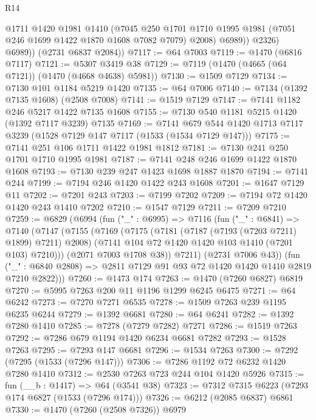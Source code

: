 \begin{lexlean}{R14}
\begin{coremodule}
                @1711
                @1420
                @1981
                @1410
                (@7045
                  @250
                  @1701
                  @1710
                  @1995
                  @1981
                  (@7051 @246 @1699 @1422 @1870 @1608 @7082 @7079)
                  @2008)
                @6989))
            @2326)
          @6989))
      (@2731 @6837 @2084))
@7117 := @64 @7003
@7119 := @1470 (@6816 @7117)
@7121 := @5307 @3419 @38
@7129 := @7119 (@1470 (@4665 (@64 @7121)) (@1470 (@4668 @4638) @5981))
@7130 := @1509 @7129
@7134 := @7130 @101 @1184 @5219 @1420
@7135 := @64 @7006
@7140 := @7134 (@1392 @7135 @1608) (@2508 @7008)
@7141 := @1519 @7129
@7147 := @7141 @1182 @246 @5217 @1422 @7135 @1608
@7155 := @7130 @540 @1181 @5215 @1420 (@1392 @7117 @3239) @7135
@7169 := @7141 @679 @544 @1420 @1713 @7117 @3239 (@1528 @7129 @147 @7117 (@1533 (@1534 @7129 @147)))
@7175 := @7141 @251 @106 @1711 @1422 @1981 @1812
@7181 := @7130 @241 @250 @1701 @1710 @1995 @1981
@7187 := @7141 @248 @246 @1699 @1422 @1870 @1608
@7193 := @7130 @239 @247 @1423 @1698 @1887 @1870
@7194 := @7141 @244
@7199 := @7194 @246 @1420 @1422 @243 @1608
@7201 := @1647 @7129 @11
@7202 := @7201 @243
@7203 := @7199 @7202
@7209 := @7194 @72 @1420 @1420 @243 @1410 @7202
@7210 := @1547 @7129
@7211 := @7209 @7210
@7259 := @6829
    (@6994
      (fun ("_" : @6995) =>
      @7116
        (fun ("_" : @6841) =>
        @7140
          (@7147
            (@7155
              (@7169
                (@7175
                  (@7181 (@7187 (@7193 (@7203 @7211) @1899) @7211) @2008)
                  (@7141 @104 @72 @1420 @1420 @103 @1410 (@7201 @103) @7210)))
              (@2071 @7003 @1708 @38))
            @7211)
          (@2731 @7006 @43))
        (fun ("_" : @6840 @2808) => @2811 @7129 @91 @93 @72 @1420 @1420 @1410 @2819 @7210 @2822)))
@7260 := @1473 @174
@7263 := @1470 (@7260 @6827) @6819
@7270 := @5995 @7263 @200 @11 @1196 @1299 @6245 @6475
@7271 := @64 @6242
@7273 := @7270 @7271 @6535
@7278 := @1509 @7263 @239 @1195 @6235 @6244
@7279 := @1392 @6681
@7280 := @64 @6241
@7282 := @1392 @7280 @1410
@7285 := @7278 (@7279 @7282) @7271
@7286 := @1519 @7263
@7292 := @7286 @679 @1194 @1420 @6234 @6681 @7282
@7293 := @1528 @7263
@7295 := @7293 @147 @6681
@7296 := @1534 @7263
@7300 := @7292 (@7295 (@1533 (@7296 @147)))
@7306 := @7286 @1192 @72 @6232 @1420 @7280 @1410
@7312 := @2530 @7263 @723 @244 @104 @1420 @5926
@7315 := fun (__b : @1417) => @64 (@3541 @38)
@7323 := @7312 @7315 @6223 (@7293 @174 @6827 (@1533 (@7296 @174)))
@7326 := @6212 (@2085 @6837) @6861
@7330 := @1470 (@7260 (@2508 @7326)) @6979

\end{coremodule}
\end{lexlean}
